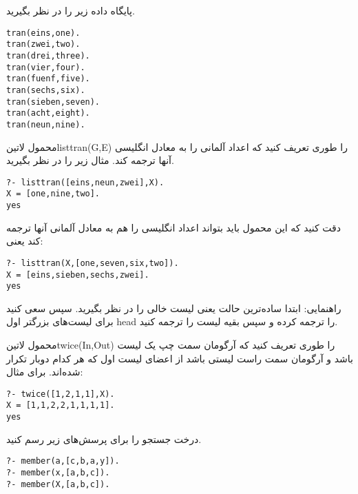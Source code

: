 \begin{exercise}
پایگاه داده زیر را در نظر بگیرید.

\begin{latin}
\begin{lstlisting}
tran(eins,one).
tran(zwei,two).
tran(drei,three).
tran(vier,four).
tran(fuenf,five).
tran(sechs,six).
tran(sieben,seven).
tran(acht,eight).
tran(neun,nine).
\end{lstlisting}
\end{latin}

محمول ‌لاتین{listtran(G,E)} را طوری تعریف کنید که اعداد آلمانی را به معادل انگلیسی آنها ترجمه کند. مثال زیر را در نظر بگیرید.

\begin{latin}
\begin{lstlisting}
?- listtran([eins,neun,zwei],X).
X = [one,nine,two].
yes
\end{lstlisting}
\end{latin}

دقت کنید که این محمول باید بتواند اعداد انگلیسی را هم به معادل آلمانی آنها ترجمه کند یعنی:

\begin{latin}
\begin{lstlisting}
?- listtran(X,[one,seven,six,two]).
X = [eins,sieben,sechs,zwei].
yes
\end{lstlisting}
\end{latin}

راهنمایی: ابتدا ساده‌ترین حالت یعنی لیست خالی را در نظر بگیرید. سپس سعی کنید برای لیست‌های بزرگتر اول head را ترجمه کرده و سپس بقیه لیست را ترجمه کنید.
\end{exercise}

\begin{exercise}
محمول ‌لاتین{twice(In,Out)} را طوری تعریف کنید که آرگومان سمت چپ یک لیست باشد و آرگومان سمت راست لیستی باشد از اعضای لیست اول که هر کدام دوبار تکرار شده‌اند. برای مثال:

\begin{latin}
\begin{lstlisting}
?- twice([1,2,1,1],X).
X = [1,1,2,2,1,1,1,1].
yes
\end{lstlisting}
\end{latin}

\end{exercise}

\begin{exercise}
درخت جستجو را برای پرسش‌های زیر رسم کنید.

\begin{latin}
\begin{lstlisting}
?- member(a,[c,b,a,y]).
?- member(x,[a,b,c]).
?- member(X,[a,b,c]).
\end{lstlisting}
\end{latin}

\end{exercise}

